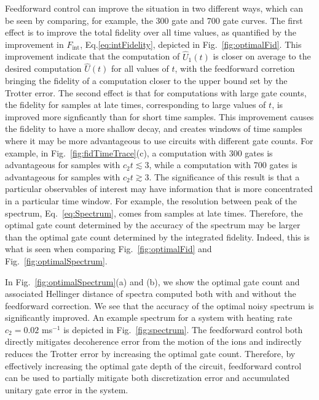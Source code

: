 \documentclass[prx,aps,twocolumn,showpacs,superscriptaddress,10pt]{revtex4-1}
\begin{document}
Feedforward control can improve the situation in two different ways, which can be seen by comparing, for example, the 300 gate and 700 gate curves. The first effect is to improve the total fidelity over all time values, as quantified by the improvement in $F_\textrm{int}$, Eq.\eqref{eq:intFidelity}, depicted in Fig.~\ref{fig:optimalFid}. This improvement indicate that the computation of $\hat{U}_{1}(t)$ is closer on average to the desired computation $\hat{U}(t)$ for all values of $t$, with the feedforward corretion bringing the fidelity of a computation closer to the upper bound set by the Trotter error. The second effect is that for computations with large gate counts, the fidelity for samples at late times, corresponding to large values of $t$, is improved more signficantly than for short time samples. This improvement causes the fidelity to have a more shallow decay, and creates windows of time samples where it may be more advantageous to use circuits with different gate counts. For example, in Fig.~\ref{fig:fidTimeTrace}(c), a computation with 300 gates is advantageous for samples with $c_{2}t\lesssim3$, while a computation with 700 gates is advantageous for samples with $c_{2}t\gtrsim3$. The significance of this result is that a particular observables of interest may have information that is more concentrated in a particular time window. For example, the resolution between peak of the spectrum, Eq.~\eqref{eq:Spectrum}, comes from samples at late times. Therefore, the optimal gate count determined by the accuracy of the spectrum may be larger than the optimal gate count determined by the integrated fidelity. Indeed, this is what is seen when comparing Fig.~\ref{fig:optimalFid} and Fig.~\ref{fig:optimalSpectrum}.


 In Fig.~\ref{fig:optimalSpectrum}(a) and (b), we show the optimal gate count and associated Hellinger distance of spectra computed both with and without the feedforward correction. We see that the accuracy of the optimal noisy spectrum is significantly improved. An example spectrum for a system with heating rate $c_{2}=0.02$ ms$^{-1}$ is depicted in Fig.~\ref{fig:spectrum}. The feedforward control both directly mitigates decoherence error from the motion of the ions and indirectly reduces the Trotter error by increasing the optimal gate count. Therefore, by effectively increasing the optimal gate depth of the circuit, feedforward control can be used to partially mitigate both discretization error and accumulated unitary gate error in the system.
\end{document}
